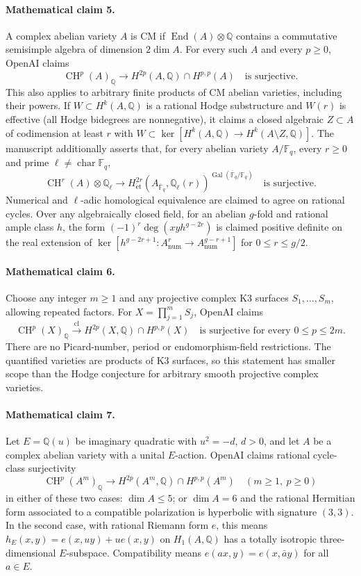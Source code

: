 \documentclass[11pt]{article}
\begin{document}
\paragraph{Mathematical claim 5.} A complex abelian variety $A$ is CM if $\operatorname{End}(A)\otimes\mathbb Q$ contains a commutative semisimple algebra of dimension $2\dim A$. For every such $A$ and every $p\ge0$, OpenAI claims
\[
\operatorname{CH}^p(A)_{\mathbb Q}\longrightarrow H^{2p}(A,\mathbb Q)\cap H^{p,p}(A)
\quad\text{is surjective}.
\]
This also applies to arbitrary finite products of CM abelian varieties, including their powers. If $W\subset H^k(A,\mathbb Q)$ is a rational Hodge substructure and $W(r)$ is effective (all Hodge bidegrees are nonnegative), it claims a closed algebraic $Z\subset A$ of codimension at least $r$ with $W\subset\ker[H^k(A,\mathbb Q)\to H^k(A\setminus Z,\mathbb Q)]$.
The manuscript additionally asserts that, for every abelian variety $A/\mathbb F_q$, every $r\ge0$ and prime $\ell\ne\operatorname{char}\mathbb F_q$,
\[
\operatorname{CH}^r(A)\otimes\mathbb Q_\ell\longrightarrow
H^{2r}_{\mathrm{\acute et}}(A_{\overline{\mathbb F}_q},\mathbb Q_\ell(r))^{\operatorname{Gal}(\overline{\mathbb F}_q/\mathbb F_q)}
\quad\text{is surjective}.
\]
Numerical and $\ell$-adic homological equivalence are claimed to agree on rational cycles. Over any algebraically closed field, for an abelian $g$-fold and rational ample class $h$, the form $(-1)^r\deg(xyh^{g-2r})$ is claimed positive definite on the real extension of $\ker[h^{g-2r+1}:A^r_{\mathrm{num}}\to A^{g-r+1}_{\mathrm{num}}]$ for $0\le r\le g/2$.

\paragraph{Mathematical claim 6.} Choose any integer $m\ge1$ and any projective complex K3 surfaces $S_1,\ldots,S_m$, allowing repeated factors. For $X=\prod_{j=1}^m S_j$, OpenAI claims
\[
\operatorname{CH}^p(X)_{\mathbb Q}\xrightarrow{\operatorname{cl}}
H^{2p}(X,\mathbb Q)\cap H^{p,p}(X)
\quad\text{is surjective for every }0\le p\le2m.
\]
There are no Picard-number, period or endomorphism-field restrictions. The quantified varieties are products of K3 surfaces, so this statement has smaller scope than the Hodge conjecture for arbitrary smooth projective complex varieties.

\paragraph{Mathematical claim 7.} Let $E=\mathbb Q(u)$ be imaginary quadratic with $u^2=-d$, $d>0$, and let $A$ be a complex abelian variety with a unital $E$-action. OpenAI claims rational cycle-class surjectivity
\[
\operatorname{CH}^p(A^m)_{\mathbb Q}\longrightarrow H^{2p}(A^m,\mathbb Q)\cap H^{p,p}(A^m)
\quad(m\ge1,\ p\ge0)
\]
in either of these two cases: $\dim A\le5$; or $\dim A=6$ and the rational Hermitian form associated to a compatible polarization is hyperbolic with signature $(3,3)$. In the second case, with rational Riemann form $e$, this means $h_E(x,y)=e(x,uy)+u e(x,y)$ on $H_1(A,\mathbb Q)$ has a totally isotropic three-dimensional $E$-subspace. Compatibility means $e(ax,y)=e(x,\bar a y)$ for all $a\in E$.
\end{document}
